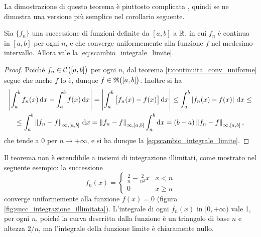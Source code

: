 La dimostrazione di questo teorema è piuttosto complicata%
, quindi se ne dimostra una versione più semplice nel corollario seguente.
\begin{corollario}
Sia $\{f_n\}$ una successione di funzioni definite da $[a,b]$ a $\mathbb{R}$, in cui $f_n$ è continua in $[a,b]$ per ogni $n$, e che converge uniformemente alla funzione $f$ nel medesimo intervallo. Allora vale la \eqref{eq:scambio_integrale_limite}.
\end{corollario}
\begin{proof}
Poiché $f_n\in\mathcal{C}^{{}}\big([a,b]\big)$ per ogni $n$, dal teorema \ref{t:continuita_conv_uniforme} segue che anche $f$ lo è, dunque $f\in\mathfrak{R}\big([a,b]\big)$. Inoltre si ha
\begin{multline*}
\left|{\int_a^bf_n(x)\,\textup{d} x-\int_a^bf(x)\,\textup{d} x}\right|=\left|{\int_a^b\big[f_n(x)-f(x)\big]\,\textup{d} x}\right|\leq\int_a^b\left|{f_n(x)-f(x)}\right|\,\textup{d} x\leq\\
\leq\int_a^b\left\|{f_n-f}\right\|_{\infty,[a,b]}\,\textup{d} x=\left\|{f_n-f}\right\|_{\infty,[a,b]}\int_a^b\textup{d} x=(b-a)\left\|{f_n-f}\right\|_{\infty,[a,b]},
\end{multline*}
che tende a 0 per $n\to+\infty$, e si ha dunque la \eqref{eq:scambio_integrale_limite}.
\end{proof}
Il teorema non è estendibile a insiemi di integrazione illimitati, come mostrato nel seguente esempio: la successione
\[
f_n(x)=\begin{cases}\frac2{n}-\frac2{n^2}x&x<n\\0&x\geq n\end{cases}
\]
converge uniformemente alla funzione $f(x)=0$ (figura \ref{fig:succ_integrazione_illimitata}). L'integrale di ogni $f_n(x)$ in $[0,+\infty)$ vale 1, per ogni $n$, poiché la curva descritta dalla funzione è un triangolo di base $n$ e altezza $2/n$, ma l'integrale della funzione limite è chiaramente nullo.



